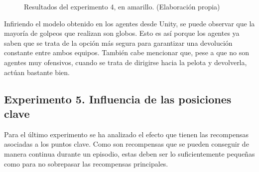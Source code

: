 \begin{figure} [H]
 \centering
 \caption[Resultados del experimento 4]{Resultados del experimento 4, en amarillo. (Elaboración propia)}
  \label{fig:exp4-plots}
\end{figure}

Infiriendo el modelo obtenido en los agentes desde Unity, se puede observar que la mayoría de golpeos que realizan son globos. Esto es así porque los agentes ya saben que se trata de la opción más segura para garantizar una devolución constante entre ambos equipos. También cabe mencionar que, pese a que no son agentes muy ofensivos, cuando se trata de dirigirse hacia la pelota y devolverla, actúan bastante bien.

\subsection{Experimento 5. Influencia de las posiciones clave}

Para el último experimento se ha analizado el efecto que tienen las recompensas asociadas a los puntos clave. Como son recompensas que se pueden conseguir de manera continua durante un episodio, estas deben ser lo suficientemente pequeñas como para no sobrepasar las recompensas principales.

